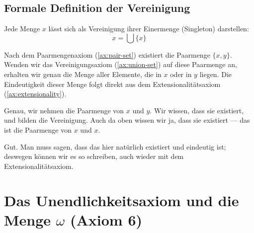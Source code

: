 \subsection{Formale Definition der Vereinigung}
\begin{math-stroke}

\begin{example}
Jede Menge $x$ lässt sich als Vereinigung ihrer Einermenge (Singleton) darstellen:
\[
x = \bigcup \{x\}
\]
\end{example}

\begin{explanation-of-steps}
Nach dem Paarmengenaxiom (\cref{ax:pair-set}) existiert die Paarmenge $\{x, y\}$. Wenden wir das Vereinigungsaxiom (\cref{ax:union-set}) auf diese Paarmenge an, erhalten wir genau die Menge aller Elemente, die in $x$ oder in $y$ liegen. Die Eindeutigkeit dieser Menge folgt direkt aus dem Extensionalitätsaxiom (\cref{ax:extensionality}).
\end{explanation-of-steps}
\end{math-stroke}

\begin{spoken-clean}[00:17:17 - 00:20:01]
Genau, wir nehmen die Paarmenge von $x$ und $y$. Wir wissen, dass sie existiert, und bilden die Vereinigung. Auch da oben wissen wir ja, dass sie existiert --- das ist die Paarmenge von $x$ und $x$.

Gut. Man muss sagen, dass das hier natürlich existiert und eindeutig ist; deswegen können wir es so schreiben, auch wieder mit dem Extensionalitätsaxiom.
\end{spoken-clean}

\section{Das Unendlichkeitsaxiom und die Menge \texorpdfstring{$\omega$}{omega} (Axiom 6)}

